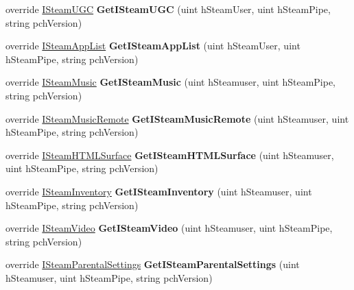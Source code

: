 \begin{DoxyCompactItemize}
override \hyperlink{class_valve_1_1_steamworks_1_1_i_steam_u_g_c}{I\+Steam\+U\+GC} {\bfseries Get\+I\+Steam\+U\+GC} (uint h\+Steam\+User, uint h\+Steam\+Pipe, string pch\+Version)
\item 
\mbox{\label{class_valve_1_1_steamworks_1_1_c_steam_client_aa440d1d2ea3f712ca0787a73536f7421}} 
override \hyperlink{class_valve_1_1_steamworks_1_1_i_steam_app_list}{I\+Steam\+App\+List} {\bfseries Get\+I\+Steam\+App\+List} (uint h\+Steam\+User, uint h\+Steam\+Pipe, string pch\+Version)
\item 
\mbox{\label{class_valve_1_1_steamworks_1_1_c_steam_client_af7d66275d8f973ec2aebb112d3914435}} 
override \hyperlink{class_valve_1_1_steamworks_1_1_i_steam_music}{I\+Steam\+Music} {\bfseries Get\+I\+Steam\+Music} (uint h\+Steamuser, uint h\+Steam\+Pipe, string pch\+Version)
\item 
\mbox{\label{class_valve_1_1_steamworks_1_1_c_steam_client_aafb9b697e448c49aaf1008c51d5a3842}} 
override \hyperlink{class_valve_1_1_steamworks_1_1_i_steam_music_remote}{I\+Steam\+Music\+Remote} {\bfseries Get\+I\+Steam\+Music\+Remote} (uint h\+Steamuser, uint h\+Steam\+Pipe, string pch\+Version)
\item 
\mbox{\label{class_valve_1_1_steamworks_1_1_c_steam_client_a4e630c23a15cc3d2f6e9b8e962915d44}} 
override \hyperlink{class_valve_1_1_steamworks_1_1_i_steam_h_t_m_l_surface}{I\+Steam\+H\+T\+M\+L\+Surface} {\bfseries Get\+I\+Steam\+H\+T\+M\+L\+Surface} (uint h\+Steamuser, uint h\+Steam\+Pipe, string pch\+Version)
\item 
\mbox{\label{class_valve_1_1_steamworks_1_1_c_steam_client_a0b92cec7a4163f19b73694216c80b90e}} 
override \hyperlink{class_valve_1_1_steamworks_1_1_i_steam_inventory}{I\+Steam\+Inventory} {\bfseries Get\+I\+Steam\+Inventory} (uint h\+Steamuser, uint h\+Steam\+Pipe, string pch\+Version)
\item 
\mbox{\label{class_valve_1_1_steamworks_1_1_c_steam_client_af2563c5d6504e680d8585bce72d2f365}} 
override \hyperlink{class_valve_1_1_steamworks_1_1_i_steam_video}{I\+Steam\+Video} {\bfseries Get\+I\+Steam\+Video} (uint h\+Steamuser, uint h\+Steam\+Pipe, string pch\+Version)
\item 
\mbox{\label{class_valve_1_1_steamworks_1_1_c_steam_client_ac2b7527253433971c7bd913c5f204cfc}} 
override \hyperlink{class_valve_1_1_steamworks_1_1_i_steam_parental_settings}{I\+Steam\+Parental\+Settings} {\bfseries Get\+I\+Steam\+Parental\+Settings} (uint h\+Steamuser, uint h\+Steam\+Pipe, string pch\+Version)
\end{DoxyCompactItemize}


